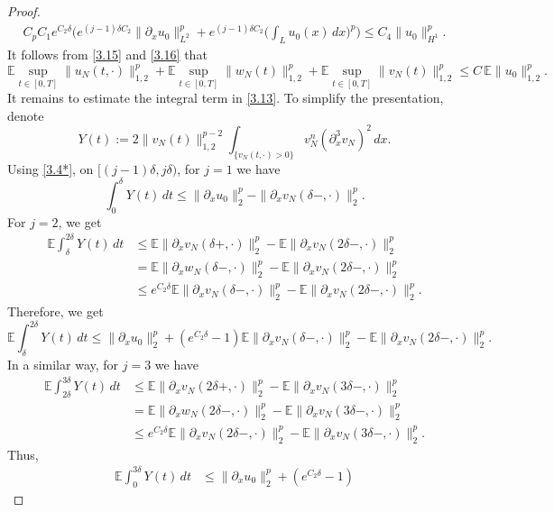 \documentclass[a4paper,12pt]{article}
\numberwithin{equation}{section}
\begin{document}
\begin{proof}
\begin{align}
C_p C_1 e^{C_2\delta}\Big(
e^{(j-1)\delta C_2}\|\partial_x u_0\|_{L^2}^p
+ e^{(j-1)\delta C_2} \Big( \int_{L} u_0(x)\,dx \Big)^p 
\Big) \le
C_4 \|u_0\|_{H^1}^{p}.
\end{align}
It follows from \eqref{3.15} and \eqref{3.16} that
\begin{equation*}
\label{3.16*}
\mathbb{E} \sup_{t \in [0,T]} \|u_N(t,\cdot)\|_{1,2}^p
 + \mathbb{E} \sup_{t \in [0,T]} \|w_N(t)\|_{1,2}^p
 + \mathbb{E} \sup_{t \in [0,T]} \|v_N(t)\|_{1,2}^p 
 \le C \, \mathbb{E} \|u_0\|_{1,2}^p.
\end{equation*}
It remains to estimate the integral term in \eqref{3.13}.
To simplify the presentation, denote
\[
Y(t) := 2 \|v_N(t)\|_{1,2}^{p-2}
\int_{\{v_N(t,\cdot)>0\}} v_N^n (\partial_x^3 v_N)^2\, dx .
\]
Using \eqref{3.4*}, on $[(j-1)\delta, j\delta)$, for $j = 1$ we have
\[
\int_{0}^{\delta} Y(t)\, dt
\le \|\partial_x u_0\|_{2}^{p}
- \|\partial_x v_N(\delta-,\cdot)\|_{2}^{p}.
\]
For $j = 2$, we get
\begin{align*}
\mathbb{E} \int_{\delta}^{2\delta} Y(t)\, dt
&\le \mathbb{E}\|\partial_x v_N(\delta+,\cdot)\|_{2}^{p}
- \mathbb{E}\|\partial_x v_N(2\delta-,\cdot)\|_{2}^{p} \\
&= \mathbb{E}\|\partial_x w_N(\delta-,\cdot)\|_{2}^{p}
- \mathbb{E}\|\partial_x v_N(2\delta-,\cdot)\|_{2}^{p} \\
&\le e^{C_2 \delta}
\mathbb{E}\|\partial_x v_N(\delta-,\cdot)\|_{2}^{p}
- \mathbb{E}\|\partial_x v_N(2\delta-,\cdot)\|_{2}^{p}.
\end{align*}
Therefore, we get
\[
\mathbb{E} \int_{\delta}^{2\delta} Y(t)\, dt
\le \|\partial_x u_0\|_{2}^{p}
+ \left(e^{C_2\delta}-1\right)
\mathbb{E}\|\partial_x v_N(\delta-,\cdot)\|_{2}^{p}
- \mathbb{E}\|\partial_x v_N(2\delta-,\cdot)\|_{2}^{p}.
\]
In a similar way, for $j = 3$ we have
\begin{align*}
\mathbb{E} \int_{2\delta}^{3\delta} Y(t)\, dt
&\le \mathbb{E}\|\partial_x v_N(2\delta+,\cdot)\|_{2}^{p}
- \mathbb{E}\|\partial_x v_N(3\delta-,\cdot)\|_{2}^{p} \\
&= \mathbb{E}\|\partial_x w_N(2\delta-,\cdot)\|_{2}^{p}
- \mathbb{E}\|\partial_x v_N(3\delta-,\cdot)\|_{2}^{p} \\
&\le e^{C_2\delta}
\mathbb{E}\|\partial_x v_N(2\delta-,\cdot)\|_{2}^{p}
- \mathbb{E}\|\partial_x v_N(3\delta-,\cdot)\|_{2}^{p}.
\end{align*}
Thus,
\begin{align*}
\mathbb{E} \int_{0}^{3\delta} Y(t)\, dt
&\le \|\partial_x u_0\|_{2}^{p}
+ \left(e^{C_2\delta}-1\right)

\end{align*}
\end{proof}
\end{document}
